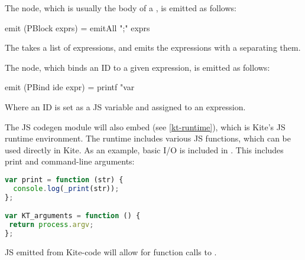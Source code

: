 The  node, which is usually the body of a , is emitted as follows:
\begin{haskell}
emit (PBlock exprs) = emitAll ";" exprs
\end{haskell}

The  takes a list of expressions, and emits the expressions with a \code{;} separating them.

The  node, which binds an ID to a given expression, is emitted as follows:
\begin{haskell}
emit (PBind ide expr) =
  printf "var %
\end{haskell}
Where an ID is set as a JS variable  and assigned to an expression.

The JS codegen module will also embed  (see \ref{kt-runtime}), which is Kite's JS runtime environment. The runtime includes various JS functions, which can be used directly in Kite. As an example, basic I/O is included in . This includes print and command-line arguments:
\begin{lstlisting}[language=Javascript]
var print = function (str) {
  console.log(_print(str));
};

var KT_arguments = function () {
 return process.argv;
};
\end{lstlisting}

JS emitted from Kite-code will allow for function calls to .

